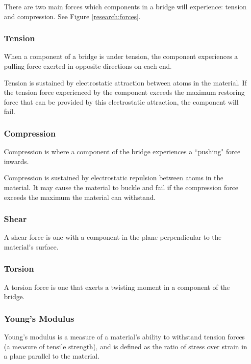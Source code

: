 \documentclass[a4paper,11pt]{article}
\begin{document}
There are two main forces which components in a bridge will experience: tension
and compression. See Figure \ref{research:forces}.


\subsubsection{Tension}

When a component of a bridge is under tension, the component experiences a
pulling force exerted in opposite directions on each end.

Tension is sustained by electrostatic attraction between atoms in the material.
If the tension force experienced by the component exceeds the maximum restoring
force that can be provided by this electrostatic attraction, the component will
fail.


\subsubsection{Compression}

Compression is where a component of the bridge experiences a ``pushing" force
inwards.

Compression is sustained by electrostatic repulsion between atoms in the
material.
It may cause the material to buckle and fail if the compression force exceeds
the maximum the material can withstand.


\subsubsection{Shear}

A shear force is one with a component in the plane perpendicular to the
material's surface.


\subsubsection{Torsion}

A torsion force is one that exerts a twisting moment in a component of the
bridge.


\subsubsection{Young's Modulus}

Young's modulus is a measure of a material's ability to withstand tension forces
(a measure of tensile strength), and is defined as the ratio of stress over
strain in a plane parallel to the material.
\end{document}
